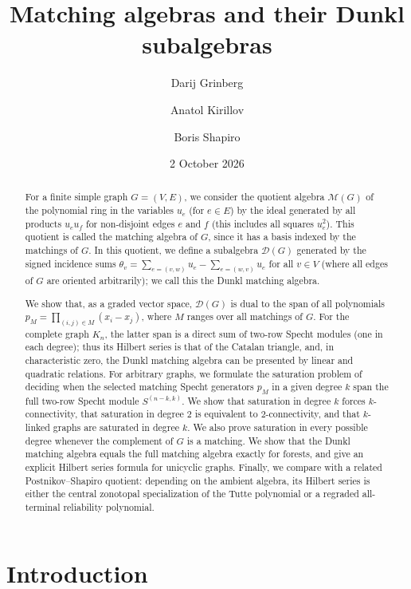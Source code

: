 \documentclass[12pt]{amsart}
\title[Matching and Dunkl matching algebras]{Matching algebras and their Dunkl subalgebras}
\author[D. Grinberg]{Darij Grinberg}
\author[A. Kirillov]{Anatol Kirillov}
\author[B. Shapiro]{Boris Shapiro}
\date{2 October 2026}
\theoremstyle{definition}
\theoremstyle{remark}
\begin{document}
\raggedbottom

\begin{abstract}
For a finite simple graph $G = (V, E)$, we consider the quotient algebra
$\mathcal M(G)$ of the polynomial ring in the variables $u_e$ (for $e \in E$)
by the ideal generated by all products $u_e u_f$ for non-disjoint edges
$e$ and $f$ (this includes all squares $u_e^2$).
This quotient is called the matching algebra of $G$, since it has a basis
indexed by the matchings of $G$.
In this quotient, we define a subalgebra $\mathcal D(G)$ generated by
the signed incidence sums $\theta_v=\sum_{e=(v,w)}u_e-\sum_{e=(w,v)}u_e$
for all $v \in V$ (where all edges of $G$ are oriented arbitrarily);
we call this the Dunkl matching algebra.

We show that, as a graded vector space, $\mathcal D(G)$ is dual to the span of all
polynomials $p_M = \prod_{(i,j) \in M} (x_i - x_j)$,
where $M$ ranges over all matchings of $G$.
For the complete graph $K_n$, the latter span is a direct sum of
two-row Specht modules (one in each degree);
thus its Hilbert series is that of the Catalan triangle, and, in
characteristic zero, the Dunkl matching algebra can be presented by
linear and quadratic relations.
For arbitrary graphs, we formulate the saturation
problem of deciding when the selected matching Specht generators $p_M$
in a given degree $k$ span the full two-row Specht module $S^{(n-k,k)}$.
We show that saturation in degree $k$ forces
$k$-connectivity, that saturation in degree $2$ is equivalent to
$2$-connectivity, and that $k$-linked graphs are saturated in degree $k$.
We also prove saturation in every possible degree whenever the complement of
$G$ is a matching.  We show that the Dunkl matching algebra equals
the full matching algebra exactly for forests, and give an explicit Hilbert
series formula for unicyclic graphs.  Finally, we compare with a related
Postnikov--Shapiro quotient: depending on the ambient algebra, its Hilbert
series is either the central zonotopal specialization of the Tutte polynomial
or a regraded all-terminal reliability polynomial.
\end{abstract}

\maketitle

\section{Introduction}
\end{document}
